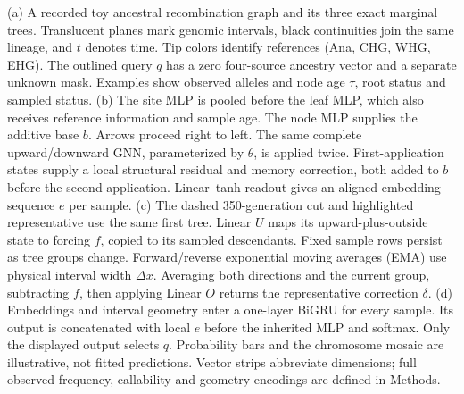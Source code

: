 \caption{(a) A recorded toy ancestral recombination graph and its three exact marginal trees. Translucent planes mark genomic intervals, black continuities join the same lineage, and $t$ denotes time. Tip colors identify references (Ana, CHG, WHG, EHG). The outlined query $q$ has a zero four-source ancestry vector and a separate unknown mask. Examples show observed alleles and node age $\tau$, root status and sampled status. (b) The site MLP is pooled before the leaf MLP, which also receives reference information and sample age. The node MLP supplies the additive base $b$. Arrows proceed right to left. The same complete upward/downward GNN, parameterized by $\theta$, is applied twice. First-application states supply a local structural residual and memory correction, both added to $b$ before the second application. Linear--tanh readout gives an aligned embedding sequence $e$ per sample. (c) The dashed 350-generation cut and highlighted representative use the same first tree. Linear $U$ maps its upward-plus-outside state to forcing $f$, copied to its sampled descendants. Fixed sample rows persist as tree groups change. Forward/reverse exponential moving averages (EMA) use physical interval width $\Delta x$. Averaging both directions and the current group, subtracting $f$, then applying Linear $O$ returns the representative correction $\delta$. (d) Embeddings and interval geometry enter a one-layer BiGRU for every sample. Its output is concatenated with local $e$ before the inherited MLP and softmax. Only the displayed output selects $q$. Probability bars and the chromosome mosaic are illustrative, not fitted predictions. Vector strips abbreviate dimensions; full observed frequency, callability and geometry encodings are defined in Methods.}
